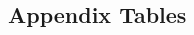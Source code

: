 \documentclass[11pt]{article}
\begin{document}
\begin{spacing}{1.4}
\newpage
\section*{Appendix Tables}





\end{spacing}
\end{document}
